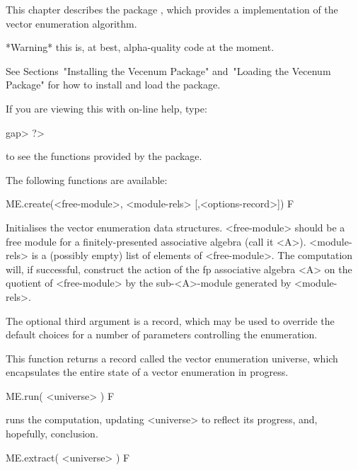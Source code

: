 

This chapter  describes  the  {\GAP}  package  {\Vecenum}, which
provides a {\GAP} implementation of the vector enumeration algorithm.

*Warning* this is, at best, alpha-quality code at the moment.

See Sections~"Installing the Vecenum Package"  and~"Loading  the  Vecenum
Package" for how to install and load the {\Vecenum} package.

If you are viewing this with on-line help, type: 

\beginexample
gap> ?>
\endexample

to see the functions provided by the {\Vecenum} package.


The following functions are available:

\>ME.create(<free-module>, <module-rels> [,<options-record>]) F

Initialises the vector enumeration data structures. <free-module>
should be a free module for a finitely-presented associative
algebra (call it <A>). <module-rels> is a (possibly empty) list of elements of
<free-module>. The computation will, if successful, construct the
action of the fp associative algebra <A> on the quotient of
<free-module> by the sub-<A>-module generated by <module-rels>.

The optional third argument is a record, which may be used to override
the default choices for a number of parameters controlling the enumeration.

This function returns a record called the vector enumeration universe,
which encapsulates the entire state of a vector enumeration in progress.

\>ME.run( <universe> ) F

runs the computation, updating <universe> to reflect its progress,
and, hopefully, conclusion.

\>ME.extract( <universe> ) F

